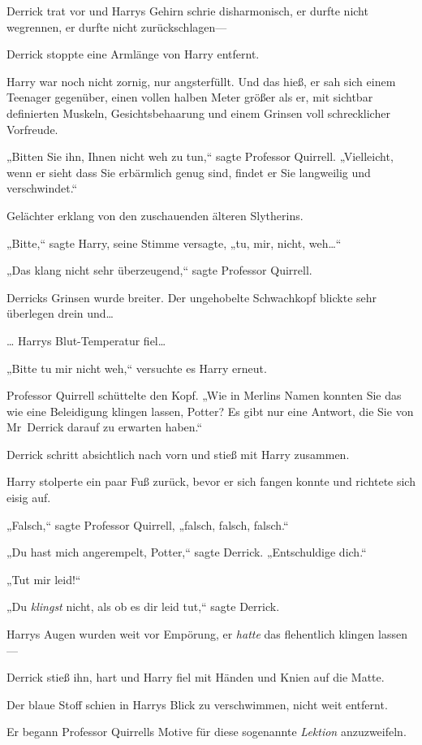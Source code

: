 {Derrick trat vor und Harrys Gehirn schrie disharmonisch, er durfte nicht wegrennen, er durfte nicht zurückschlagen—

Derrick stoppte eine Armlänge von Harry entfernt.

Harry war noch nicht zornig, nur angsterfüllt. Und das hieß, er sah sich einem Teenager gegenüber, einen vollen halben Meter größer als er, mit sichtbar definierten Muskeln, Gesichtsbehaarung und einem Grinsen voll schrecklicher Vorfreude.

„Bitten Sie ihn, Ihnen nicht weh zu tun,“ sagte Professor Quirrell. „Vielleicht, wenn er sieht dass Sie erbärmlich genug sind, findet er Sie langweilig und verschwindet.“

Gelächter erklang von den zuschauenden älteren Slytherins.

„Bitte,“ sagte Harry, seine Stimme versagte, „tu, mir, nicht, weh…“

„Das klang nicht sehr überzeugend,“ sagte Professor Quirrell.

Derricks Grinsen wurde breiter. Der ungehobelte Schwachkopf blickte sehr überlegen drein und…

… Harrys Blut-Temperatur fiel…

„Bitte tu mir nicht weh,“ versuchte es Harry erneut.

Professor Quirrell schüttelte den Kopf. „Wie in Merlins Namen konnten Sie das wie eine Beleidigung klingen lassen, Potter? Es gibt nur eine Antwort, die Sie von Mr~Derrick darauf zu erwarten haben.“

Derrick schritt absichtlich nach vorn und stieß mit Harry zusammen.

Harry stolperte ein paar Fuß zurück, bevor er sich fangen konnte und richtete sich eisig auf.

„Falsch,“ sagte Professor Quirrell, „falsch, falsch, falsch.“

„Du hast mich angerempelt, Potter,“ sagte Derrick. „Entschuldige dich.“

„Tut mir leid!“

„Du \emph{klingst} nicht, als ob es dir leid tut,“ sagte Derrick.

Harrys Augen wurden weit vor Empörung, er \emph{hatte} das flehentlich klingen lassen—

Derrick stieß ihn, hart und Harry fiel mit Händen und Knien auf die Matte.

Der blaue Stoff schien in Harrys Blick zu verschwimmen, nicht weit entfernt.

Er begann Professor Quirrells Motive für diese sogenannte \emph{Lektion} anzuzweifeln.

}
